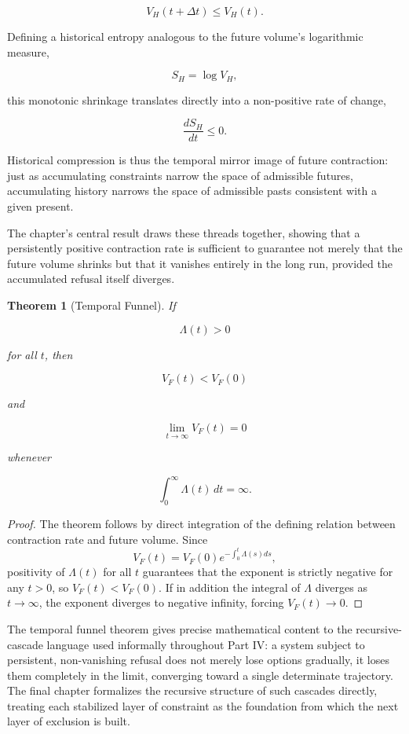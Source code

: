\documentclass[11pt,oneside]{book}
\theoremstyle{plain}
\newtheorem{theorem}{Theorem}[chapter]
\theoremstyle{definition}
\theoremstyle{remark}
\begin{document}
\[
V_H(t+\Delta t)
\le
V_H(t).
\]

Defining a historical entropy analogous to the future volume's logarithmic measure,

\[
S_H
=
\log V_H,
\]

this monotonic shrinkage translates directly into a non-positive rate of change,

\[
\frac{dS_H}{dt}
\le0.
\]

Historical compression is thus the temporal mirror image of future contraction: just as accumulating constraints narrow the space of admissible futures, accumulating history narrows the space of admissible pasts consistent with a given present.

The chapter's central result draws these threads together, showing that a persistently positive contraction rate is sufficient to guarantee not merely that the future volume shrinks but that it vanishes entirely in the long run, provided the accumulated refusal itself diverges.

\begin{theorem}[Temporal Funnel]
If

\[
\Lambda(t)>0
\]

for all
\(t\), then

\[
V_F(t)
<
V_F(0)
\]

and

\[
\lim_{t\to\infty}
V_F(t)
=
0
\]

whenever

\[
\int_0^\infty
\Lambda(t)\,dt
=
\infty.
\]
\end{theorem}

\begin{proof}
The theorem follows by direct integration of the defining relation between contraction rate and future volume. Since
\[
V_F(t)
=
V_F(0)
e^{-\int_0^t\Lambda(s)ds},
\]
positivity of \(\Lambda(t)\) for all \(t\) guarantees that the exponent is strictly negative for any \(t>0\), so \(V_F(t)<V_F(0)\). If in addition the integral of \(\Lambda\) diverges as \(t\to\infty\), the exponent diverges to negative infinity, forcing \(V_F(t)\to0\).
\end{proof}

The temporal funnel theorem gives precise mathematical content to the recursive-cascade language used informally throughout Part IV: a system subject to persistent, non-vanishing refusal does not merely lose options gradually, it loses them completely in the limit, converging toward a single determinate trajectory. The final chapter formalizes the recursive structure of such cascades directly, treating each stabilized layer of constraint as the foundation from which the next layer of exclusion is built.
\end{document}
